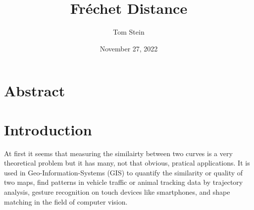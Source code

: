 \documentclass[
oneside,
fontsize=11pt
]{scrartcl}
\title{Fréchet Distance}
\author{Tom Stein}
\date{November 27, 2022}
\begin{document}


%






\newpage




\section*{Abstract}


\section{Introduction}
At first it seems that measuring the similairty between two curves
is a very theoretical problem
but it has many, not that obvious, pratical applications.
It is used in Geo-Information-Systems (GIS) to 
quantify the similarity or quality of two maps, %
find patterns in vehicle traffic or animal tracking data 
by trajectory analysis, %
gesture recognition on touch devices like smartphones, %
and shape matching in the field of computer vision. 
\end{document}
